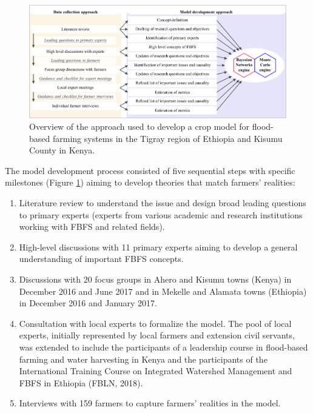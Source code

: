 \documentclass[]{elsarticle} %
\begin{document}
\begin{figure}[!h]

{\centering \includegraphics[width=1\linewidth,]{figures/approach-overview-1} 

}

\caption{Overview of the approach used to develop a crop model for flood-based farming systems in the Tigray region of Ethiopia and Kisumu County in Kenya.}\label{fig:fig2}
\end{figure}

The model development process consisted of five sequential steps with specific milestones (Figure \ref{fig:fig2}) aiming to develop theories that match farmers' realities:

\begin{enumerate}
\def\labelenumi{\arabic{enumi}.}
\item
  Literature review to understand the issue and design broad leading questions to primary experts (experts from various academic and research institutions working with FBFS and related fields).
\item
  High-level discussions with 11 primary experts aiming to develop a general understanding of important FBFS concepts.
\item
  Discussions with 20 focus groups in Ahero and Kisumu towns (Kenya) in December 2016 and June 2017 and in Mekelle and Alamata towns (Ethiopia) in December 2016 and January 2017.
\item
  Consultation with local experts to formalize the model. The pool of local experts, initially represented by local farmers and extension civil servants, was extended to include the participants of a leadership course in flood-based farming and water harvesting in Kenya and the participants of the International Training Course on Integrated Watershed Management and FBFS in Ethiopia (FBLN, 2018).
\item
  Interviews with 159 farmers to capture farmers' realities in the model.
\end{enumerate}
\end{document}
